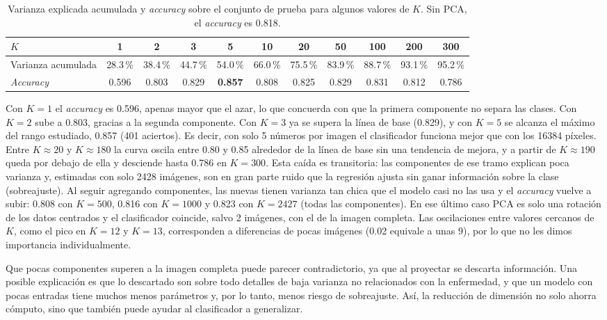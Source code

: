 \documentclass[11pt,a4paper]{article}
\newcommand{\acc}{\emph{accuracy}}
\begin{document}
\begin{table}[H]
  \centering
  \caption{Varianza explicada acumulada y \emph{accuracy} sobre el conjunto de prueba para algunos valores
           de $K$. Sin PCA, el \emph{accuracy} es 0.818.}
  \label{tab:acck}
  \small\setlength{\tabcolsep}{3pt}
  \begin{tabular}{lcccccccccc}
    \toprule
    $K$ & 1 & 2 & 3 & 5 & 10 & 20 & 50 & 100 & 200 & 300 \\
    \midrule
    Varianza acumulada & 28.3\,\% & 38.4\,\% & 44.7\,\% & 54.0\,\% & 66.0\,\% & 75.5\,\% & 83.9\,\% & 88.7\,\% & 93.1\,\% & 95.2\,\% \\
    \emph{Accuracy}    & 0.596 & 0.803 & 0.829 & \textbf{0.857} & 0.808 & 0.825 & 0.829 & 0.831 & 0.812 & 0.786 \\
    \bottomrule
  \end{tabular}
\end{table}

Con $K=1$ el \acc{} es 0.596, apenas mayor que el azar, lo que concuerda con que la primera componente no
separa las clases. Con $K=2$ sube a 0.803, gracias a la segunda componente. Con $K=3$ ya se supera la línea
de base (0.829), y con $K=5$ se alcanza el máximo del rango estudiado, 0.857 (401 aciertos). Es decir, con
solo 5 números por imagen el clasificador funciona mejor que con los 16384 píxeles. Entre $K\approx20$ y
$K\approx180$ la curva oscila entre 0.80 y 0.85 alrededor de la línea de base sin una tendencia de mejora,
y a partir de $K\approx190$ queda por debajo de ella y desciende hasta 0.786 en $K=300$. Esta caída es
transitoria: las componentes de ese tramo explican poca varianza y, estimadas con solo 2428 imágenes,
son en gran parte ruido que la regresión ajusta sin ganar información sobre la clase (sobreajuste).
Al seguir agregando componentes, las nuevas tienen varianza tan chica que el modelo casi no las usa y
el \acc{} vuelve a subir: 0.808 con $K=500$, 0.816 con $K=1000$ y 0.823 con $K=2427$ (todas las
componentes). En ese último caso PCA es solo una rotación de los datos centrados y el clasificador
coincide, salvo 2 imágenes, con el de la imagen completa. Las oscilaciones entre
valores cercanos de $K$, como el pico en $K=12$ y $K=13$, corresponden a diferencias de pocas imágenes (0.02
equivale a unas 9), por lo que no les dimos importancia individualmente.

Que pocas componentes superen a la imagen completa puede parecer contradictorio, ya que al proyectar se
descarta información. Una posible explicación es que lo descartado son sobre todo detalles de baja varianza
no relacionados con la enfermedad, y que un modelo con pocas entradas tiene muchos menos parámetros y, por
lo tanto, menos riesgo de sobreajuste. Así, la reducción de dimensión no solo ahorra cómputo, sino que
también puede ayudar al clasificador a generalizar.
\end{document}
